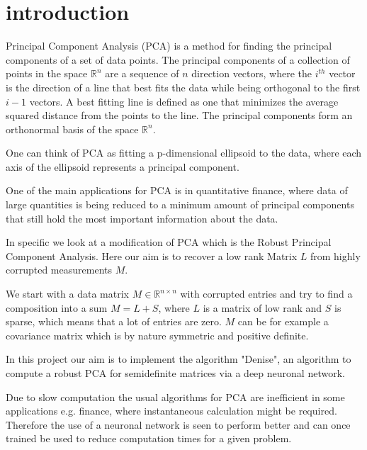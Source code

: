 \section{introduction}

Principal Component Analysis (PCA) is a method for finding the principal components of a set of data points. The principal components of a collection of points in the space $\mathbb{R}^n$ are a sequence of $n$ direction vectors, where the $i^{th}$ vector is the direction of a line that best fits the data while being orthogonal to the first $i-1$ vectors. A best fitting line is defined as one that minimizes the average squared distance from the points to the line. The principal components form an orthonormal basis of the space $\mathbb{R}^n$.

One can think of PCA as fitting a p-dimensional ellipsoid to the data, where each axis of the ellipsoid represents a principal component.
\newline

One of the main applications for PCA is in quantitative finance, where data of large quantities is being reduced to a minimum amount of principal components that still hold the most important information about the data. 
\newline

In specific we look at a modification of PCA which is the Robust Principal Component Analysis. Here our aim is to recover a low rank Matrix $L$ from highly corrupted measurements $M$.
\newline

We start with a data matrix $M \in \mathbb{R}^{n \times n}$ with corrupted entries and try to find a composition into a sum $M = L + S$, where $L$ is a matrix of low rank and $S$ is sparse, which means that a lot of entries are zero. $M$ can be for example a covariance matrix which is by nature symmetric and positive definite.
\newline

In this project our aim is to implement the algorithm "Denise", an algorithm to compute a robust PCA for semidefinite matrices via a deep neuronal network.
\newline

Due to slow computation the usual algorithms for PCA are inefficient in some applications e.g. finance, where instantaneous calculation might be required. Therefore the use of a neuronal network is seen to perform better and can once trained be used to reduce computation times for a given problem.

